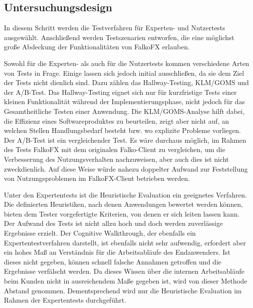\subsection{Untersuchungsdesign}
In diesem Schritt werden die Testverfahren für Experten- und Nutzertests ausgewählt. Anschließend werden Testszenarien entworfen, die eine möglichst große Abdeckung der Funktionalitäten von FalkoFX erlauben.\par
{}
Sowohl für die Experten- als auch für die Nutzertests kommen verschiedene Arten von Tests in Frage. Einige lassen sich jedoch initial ausschließen, da sie dem Ziel der Tests nicht dienlich sind. Dazu zählen das Hallway-Testing, KLM/GOMS und der A/B-Test. Das Hallway-Testing eignet sich nur für kurzfristige Tests einer kleinen Funktionalität während der Implementierungsphase, nicht jedoch für das Gesamtheitliche Testen einer Anwendung. Die KLM/GOMS-Analyse hilft dabei, die Effizienz eines Softwareproduktes zu beurteilen, zeigt aber nicht auf, an welchen Stellen Handlungsbedarf besteht bzw. wo explizite Probleme vorliegen. Der A/B-Test ist ein vergleichender Test. Es wäre durchaus möglich, im Rahmen des Tests FalkoFX mit dem originalen Falko-Client zu vergleichen, um die Verbesserung des Nutzungsverhalten nachzuweisen, aber auch dies ist nicht zweckdienlich. Auf diese Weise würde nahezu doppelter Aufwand zur Feststellung von Nutzungsproblemen im FalkoFX-Client betrieben werden.\par
Unter den Expertentests ist die Heuristische Evaluation ein geeignetes Verfahren. Die definierten Heuristiken, nach denen Anwendungen bewertet werden können, bieten dem Tester vorgefertigte Kriterien, von denen er sich leiten lassen kann. Der Aufwand des Tests ist nicht allzu hoch und doch werden zuverlässige Ergebnisse erzielt. Der Cognitive Walkthrough, der ebenfalls ein Expertentestverfahren darstellt, ist ebenfalls nicht sehr aufwendig, erfordert aber ein hohes Maß an Verständnis für die Arbeitsabläufe des Endanwenders. Ist dieses nicht gegeben, können schnell falsche Annahmen getroffen und die Ergebnisse verfälscht werden. Da dieses Wissen über die internen Arbeitsabläufe beim Kunden nicht in ausreichendem Maße gegeben ist, wird von dieser Methode Abstand genommen. Dementsprechend wird nur die Heuristische Evaluation im Rahmen der Expertentests durchgeführt.\par
